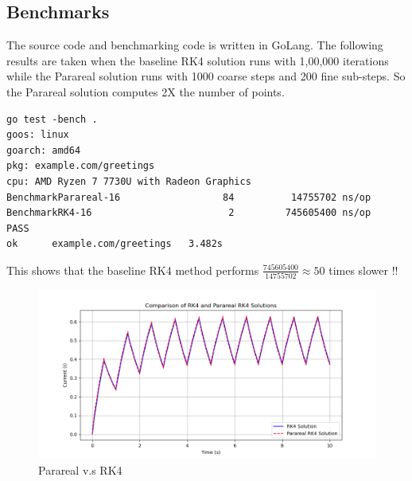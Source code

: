 \subsection{Benchmarks}
The source code and benchmarking code is written in GoLang.
The following results are taken when the baseline RK4 solution runs with 1,00,000 iterations while the Parareal solution runs with 1000 coarse steps and 200 fine sub-steps. So the Parareal solution computes 2X the number of points.
\newpage
\begin{verbatim}
go test -bench .  
goos: linux
goarch: amd64
pkg: example.com/greetings
cpu: AMD Ryzen 7 7730U with Radeon Graphics         
BenchmarkParareal-16                  84          14755702 ns/op
BenchmarkRK4-16                        2         745605400 ns/op
PASS
ok      example.com/greetings   3.482s
\end{verbatim}
This shows that the baseline RK4 method performs $\frac{745605400 }{14755702} \approx 50$ times slower !!
\begin{figure}
    \centering
    \includegraphics[width=0.8\linewidth]{figs/benchmark.png}
    \caption{Parareal v.s RK4}
\end{figure}